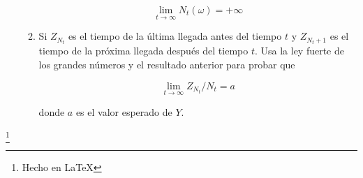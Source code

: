 \documentclass[a4paper,11pt]{report}
\begin{document}
\begin{enumerate}
\begin{enumerate}
	\[
	\lim_{t \rightarrow \infty}N_t(\omega) = + \infty
	\]
	
	\item Si $Z_{N_{t}}$ es el tiempo de la \'ultima llegada antes del tiempo $t$ y $Z_{N_{t} + 1}$ es el tiempo de la pr\'oxima  llegada despu\'es  del tiempo $t$. Usa la ley fuerte de los grandes n\'umeros y el resultado anterior para probar que 
	
	\[
	\lim_{t \rightarrow \infty}Z_{N_{t}}/N_{t} = a
	\] 
	
	donde $a$ es el valor esperado de $Y$.
\end{enumerate}
\end{enumerate}

\begin{flushright}
\footnote{Hecho en \LaTeX}
\end{flushright}
\end{document}
